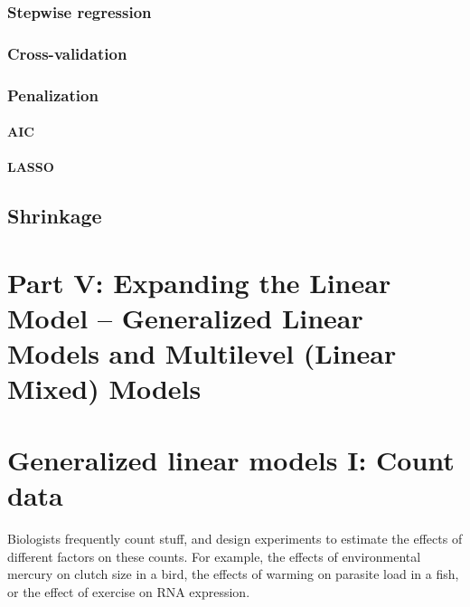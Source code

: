 \documentclass[]{book}
\begin{document}
\subsection{Stepwise regression}\label{stepwise-regression}

\subsection{Cross-validation}\label{cross-validation}

\subsection{Penalization}\label{penalization}

\subsubsection{AIC}\label{aic}

\subsubsection{LASSO}\label{lasso}

\section{Shrinkage}\label{shrinkage}

\chapter*{Part V: Expanding the Linear Model -- Generalized Linear
Models and Multilevel (Linear Mixed)
Models}\label{part-v-expanding-the-linear-model-generalized-linear-models-and-multilevel-linear-mixed-models}

\chapter{Generalized linear models I: Count
data}\label{generalized-linear-models-i-count-data}

Biologists frequently count stuff, and design experiments to estimate
the effects of different factors on these counts. For example, the
effects of environmental mercury on clutch size in a bird, the effects
of warming on parasite load in a fish, or the effect of exercise on RNA
expression.
\end{document}
